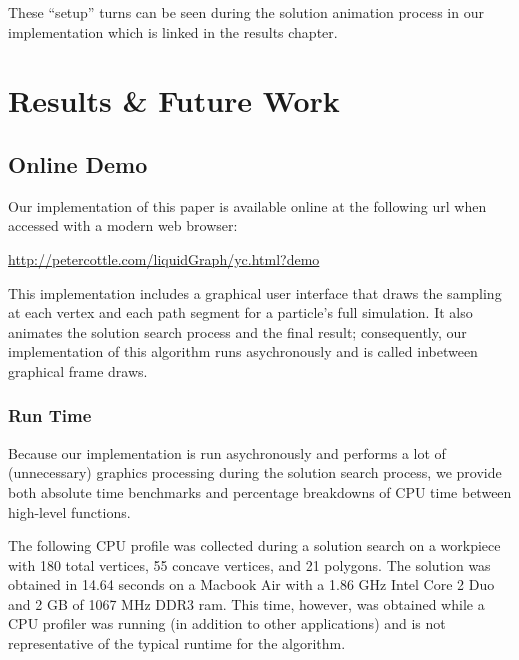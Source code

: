 
These ``setup'' turns can be seen during the solution animation process in our implementation which is linked in the results chapter.

					\chapter{Results \& Future Work}

\section{Online Demo}

Our implementation of this paper is available online at the following url when accessed with a modern web browser:

\vspace{0.2in}

\begin{centering}
\url{http://petercottle.com/liquidGraph/yc.html?demo}
\end{centering}

\vspace{0.2in}

This implementation includes a graphical user interface that draws the sampling at each vertex and each path segment for a particle's full simulation. It also animates the solution search process and the final result; consequently, our implementation of this algorithm runs asychronously and is called inbetween graphical frame draws.

	\subsection{Run Time}

Because our implementation is run asychronously and performs a lot of (unnecessary) graphics processing during the solution search process, we provide both absolute time benchmarks and percentage breakdowns of CPU time between high-level functions.

The following CPU profile was collected during a solution search on a workpiece with 180 total vertices, 55 concave vertices, and 21 polygons. The solution was obtained in 14.64 seconds on a Macbook Air with a 1.86 GHz Intel Core 2 Duo and 2 GB of 1067 MHz DDR3 ram. This time, however, was obtained while a CPU profiler was running (in addition to other applications) and is not representative of the typical runtime for the algorithm.

